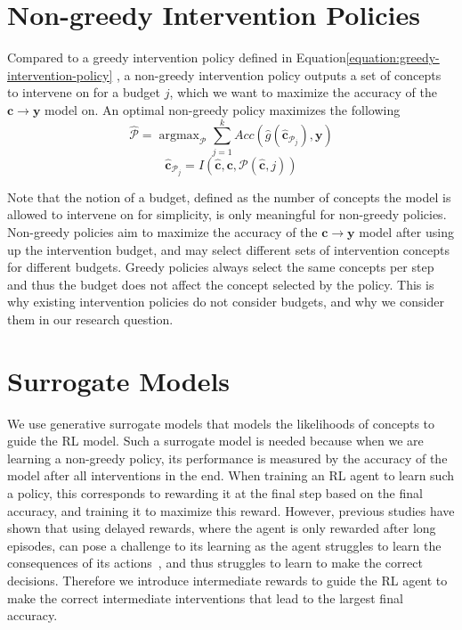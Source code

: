 \section{Non-greedy Intervention Policies}
\label{method:non-greedy-policies}

Compared to a greedy intervention policy
defined in Equation\ref{equation:greedy-intervention-policy}
, a non-greedy intervention 
policy outputs a set of concepts to intervene on for a budget $j$,
which we want to maximize the accuracy of the $\mathbf{c} \to \mathbf{y}$ model on. 
An optimal non-greedy policy maximizes the following
\[\hat{\mathcal{P}} = \mathop{\mathrm{argmax}}_{\mathcal{P}} \sum_{j=1}^k Acc(\hat{g}(\hat{\mathbf{c}}_{\mathcal{P}_j}), \mathbf{y}) \]
\[\hat{\mathbf{c}}_{\mathcal{P}_j} = I(\hat{\mathbf{c}}, \mathbf{c}, \mathcal{P}(\hat{\mathbf{c}}, j))\]

Note that the notion of a budget, defined as the number
of concepts the model is allowed to intervene on for simplicity, is only
meaningful for non-greedy policies. Non-greedy policies aim
to maximize the accuracy of the $\mathbf{c} \to \mathbf{y}$ model after using up the intervention budget,
and may select different sets of intervention concepts 
for different budgets. Greedy policies always select the same
concepts per step and thus the budget does not 
affect the concept selected by the policy.
This is why existing intervention policies do not consider
budgets, and why we consider them in our research question.


\section{Surrogate Models}\label{method:surrogate}

We use generative surrogate models that models the likelihoods of concepts
to guide the RL model. 
Such a surrogate model is needed because
when we are learning
a non-greedy policy, its performance is measured by the accuracy
of the model after all interventions in the end.
When training an RL agent to learn such a policy, this corresponds
to rewarding it at the final step based 
on the final accuracy, and training it to maximize this reward.
However, previous studies have shown that
using delayed rewards, where the agent is only rewarded after long episodes,
can pose a challenge to its learning as the agent struggles to learn
the consequences of its actions~\cite{ steps-towards-ai, temporal-credit-assignment},
and thus struggles to learn to make the correct decisions.
Therefore we introduce intermediate rewards 
to guide the RL agent to make the correct intermediate
interventions that lead 
to the largest final accuracy.

